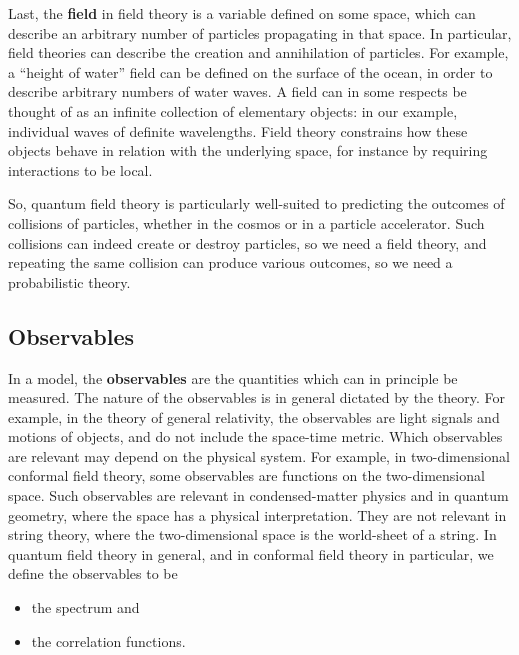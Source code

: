 \documentclass[12pt,a4paper,notitlepage]{report}
\numberwithin{equation}{section}
\theoremstyle{break}
\begin{document}
Last, the \textbf{\boldmath field} in field theory is a variable defined on some space, which can describe an arbitrary number of particles propagating in that space. In particular, field theories can describe the creation and annihilation of particles. For example, a ``height of water'' field can be defined on the surface of the ocean, in order to describe arbitrary numbers of water waves. A field can in some respects be thought of as an infinite collection of elementary objects: in our example, individual waves of definite wavelengths.
Field theory constrains how these objects behave in relation with the underlying space, for instance by requiring interactions to be local.

So, quantum field theory is particularly well-suited to predicting the outcomes of collisions of particles, whether in the cosmos or in a particle accelerator. Such collisions can indeed create or destroy particles, so we need a field theory, and repeating the same collision can produce various outcomes, so we need a probabilistic theory. 

\subsection{Observables}

In a model, the \textbf{\boldmath observables} are the quantities which can in principle be measured. The nature of the observables is in general dictated by the theory. For example, in the theory of general relativity, the observables are light signals and motions of objects, and do not include the space-time metric. 
Which observables are relevant may depend on the physical system. For example, in two-dimensional conformal field theory, some observables are functions on the two-dimensional space. Such observables are relevant in condensed-matter physics and in quantum geometry, where the space has a physical interpretation. They are not relevant in string theory, where the two-dimensional space is the world-sheet of a string. 
In quantum field theory in general, and in conformal field theory in particular, we define the observables to be 
\begin{itemize}
 \item the spectrum and
\item the correlation functions.
\end{itemize}
\end{document}
